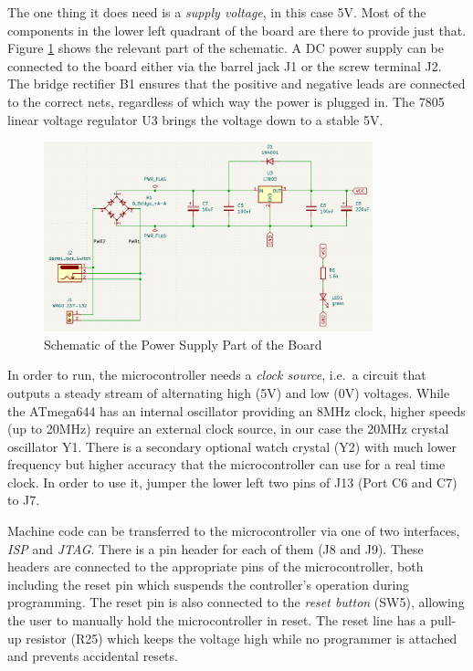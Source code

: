 \documentclass{article}
\begin{document}
The one thing it does need is a \emph{supply voltage}, in this case 5V. Most of the components in the lower left quadrant of the board are there to provide just that. Figure \ref{fig:schematicPowerSupply} shows the relevant part of the schematic. A DC power supply can be connected to the board either via the barrel jack J1 or the screw terminal J2. The bridge rectifier B1 ensures that the positive and negative leads are connected to the correct nets, regardless of which way the power is plugged in. The 7805 linear voltage regulator U3 brings the voltage down to a stable 5V. 
\begin{figure}[htb]
\centering
\includegraphics[width=0.85\textwidth]{Pictures/SchematicPowerSupply.png}
\caption{Schematic of the Power Supply Part of the Board}
\label{fig:schematicPowerSupply}
\end{figure}

In order to run, the microcontroller needs a \emph{clock source}, i.e.\ a circuit that outputs a steady stream of alternating high (5V) and low (0V) voltages. While the ATmega644 has an internal oscillator providing an 8MHz clock, higher speeds (up to 20MHz) require an external clock source, in our case the 20MHz crystal oscillator Y1. 
There is a secondary optional watch crystal (Y2) with much lower frequency but higher accuracy that the microcontroller can use for a real time clock. In order to use it, jumper the lower left two pins of J13 (Port C6 and C7) to J7. 

Machine code can be transferred to the microcontroller via one of two interfaces, \emph{ISP} and \emph{JTAG}. There is a pin header for each of them (J8 and J9). These headers are connected to the appropriate pins of the microcontroller, both including the reset pin which suspends the controller's operation during programming. The reset pin is also connected to the \emph{reset button} (SW5), allowing the user to manually hold the microcontroller in reset. The reset line has a pull-up resistor (R25) which keeps the voltage high while no programmer is attached and prevents accidental resets. 
\end{document}
